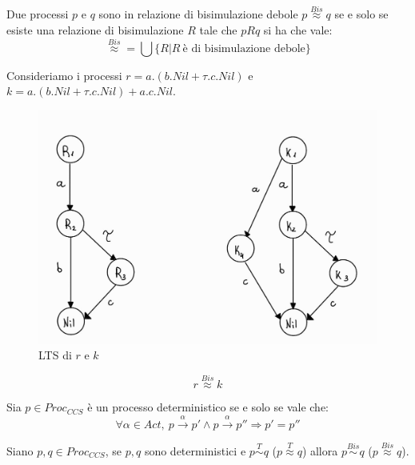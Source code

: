 Due processi $p$ e $q$ sono in relazione di bisimulazione debole $p
    \stackrel{Bis}{\approx} q$
se e solo se esiste una relazione di bisimulazione $R$ tale che $p R q$ si ha che vale:
\begin{equation}
    \stackrel{Bis}{\approx} = \bigcup \{R | R \ \text{è di bisimulazione debole}\}
\end{equation}
\begin{esempio}
    Consideriamo i processi $r = a . (b . Nil + \tau . c . Nil)$
    e $k = a . (b . Nil + \tau . c . Nil) + a . c . Nil$.
    \begin{figure}[!ht]
        \centering
        \includegraphics[scale=0.25]{img/ccs/Esempio3.png}
        \caption{LTS di $r$ e $k$}
    \end{figure}
    $$r \stackrel{Bis}{\approx} k$$
\end{esempio}
\begin{definizione}
    Sia $p \in Proc_{CCS}$ è un processo deterministico se e solo se vale che:
    \begin{equation}
        \forall \alpha \in Act, \ p \xrightarrow{\alpha} p' \land p
        \xrightarrow{\alpha} p'' \Rightarrow p' = p''
    \end{equation}
\end{definizione}
\begin{osservazione}
    Siano $p, q \in Proc_{CCS}$, se $p, q$ sono deterministici e $p \stackrel{T}{\sim}
        q$ ($p \stackrel{T}{\approx} q$) allora $p \stackrel{Bis}{\sim}
        q$ ($p \stackrel{Bis}{\approx} q$).
\end{osservazione}
